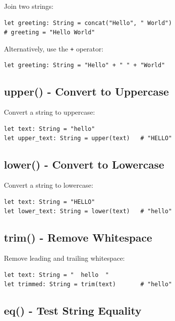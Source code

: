 \documentclass[11pt,twoside,openright]{book}
\begin{document}
Join two strings:

\begin{lstlisting}[language=ConstructLang]
let greeting: String = concat("Hello", " World")
# greeting = "Hello World"
\end{lstlisting}

Alternatively, use the \texttt{+} operator:

\begin{lstlisting}[language=ConstructLang]
let greeting: String = "Hello" + " " + "World"
\end{lstlisting}

\subsection{upper() - Convert to Uppercase}

Convert a string to uppercase:

\begin{lstlisting}[language=ConstructLang]
let text: String = "hello"
let upper_text: String = upper(text)   # "HELLO"
\end{lstlisting}

\subsection{lower() - Convert to Lowercase}

Convert a string to lowercase:

\begin{lstlisting}[language=ConstructLang]
let text: String = "HELLO"
let lower_text: String = lower(text)   # "hello"
\end{lstlisting}

\subsection{trim() - Remove Whitespace}

Remove leading and trailing whitespace:

\begin{lstlisting}[language=ConstructLang]
let text: String = "  hello  "
let trimmed: String = trim(text)       # "hello"
\end{lstlisting}

\subsection{eq() - Test String Equality}
\end{document}
